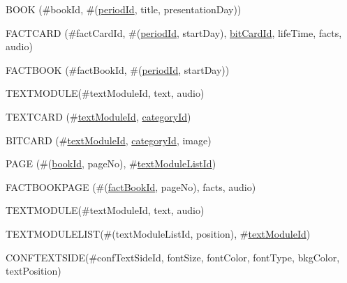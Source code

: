 \begin{list}{}
	\item BOOK (\#bookId, \#(\underline{periodId}, title, presentationDay))
	\item FACTCARD (\#factCardId, \#(\underline{periodId}, startDay),  \underline{bitCardId}, lifeTime, facts, audio)
	\item FACTBOOK (\#factBookId, \#(\underline{periodId}, startDay))
	\item TEXTMODULE(\#textModuleId, text, audio)
	\item TEXTCARD (\#\underline{textModuleId}, \underline{categoryId})
	\item BITCARD (\#\underline{textModuleId}, \underline{categoryId}, image)
	\item PAGE (\#(\underline{bookId}, pageNo), \#\underline{textModuleListId})
	\item FACTBOOKPAGE (\#(\underline{factBookId}, pageNo), facts, audio)
	\item TEXTMODULE(\#textModuleId, text, audio)
	\item TEXTMODULELIST(\#(textModuleListId, position), \#\underline{textModuleId})
	\item CONFTEXTSIDE(\#confTextSideId, fontSize, fontColor, fontType, bkgColor, textPosition)
\end{list}
